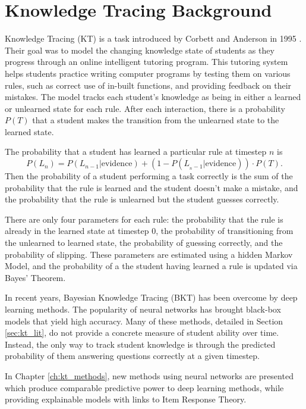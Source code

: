 \chapter{Knowledge Tracing Background}

Knowledge Tracing (KT) is a task introduced by Corbett and Anderson in 1995 \cite{corbett1995}. Their goal was to model the changing knowledge state of students as they progress through an online intelligent tutoring program. This tutoring system helps students practice writing computer programs by testing them on various rules, such as correct use of in-built functions, and providing feedback on their mistakes. The model tracks each student's knowledge as being in either a learned or unlearned state for each rule. After each interaction, there is a probability $P(T)$ that a student makes the transition from the unlearned state to the learned state.

The probability that a student has learned a particular rule at timestep $n$ is
\begin{equation}
P(L_n) = P(L_{n-1} | \text{evidence}) + (1 - P(L_{_n-1} | \text{evidence})) \cdot P(T).
\label{eq:kt}
\end{equation}
Then the probability of a student performing a task correctly is the sum of the probability that the rule is learned and the student doesn't make a mistake, and the probability that the rule is unlearned but the student guesses correctly.

There are only four parameters for each rule: the probability that the rule is already in the learned state at timestep 0, the probability of transitioning from the unlearned to learned state, the probability of guessing correctly, and the probability of slipping. These parameters are estimated using a hidden Markov Model, and the probability of a the student having learned a rule is updated via Bayes' Theorem.

In recent years, Bayesian Knowledge Tracing (BKT) has been overcome by deep learning methods. The popularity of neural networks has brought black-box models that yield high accuracy. Many of these methods, detailed in Section \ref{sec:kt_lit}, do not provide a concrete measure of student ability over time. Instead, the only way to track student knowledge is through the predicted probability of them answering questions correctly at a given timestep. 

In Chapter \ref{ch:kt_methods}, new methods using neural networks are presented which produce comparable predictive power to deep learning methods, while providing explainable models with links to Item Response Theory.


